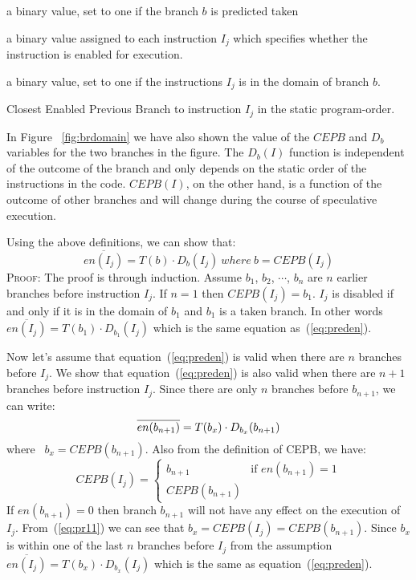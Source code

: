 \documentclass[10pt,twocolumn]{IEEEtran}
\begin{document}
\begin{description}
\item[$T(b)$:] a binary value, set to one if the branch $b$ is
predicted taken
\item[$en(I_j)$:] a binary value assigned to each
instruction $I_j$ which specifies whether the instruction is
enabled for execution.
\item[$D_b(I_j)$:] a binary value,
set to one if the instructions $I_j$ is in the domain of branch $b$.
\item[$CEPB(I_j)$:] Closest Enabled Previous Branch to instruction
$I_j$ in the static program-order.
\end{description}

In Figure ~\ref{fig:brdomain} we have also shown 
the value of the $CEPB$ and $D_b$ variables for the
two branches in the f{ig}ure.
The $D_b(I)$ function is
independent of the outcome of the branch and only depends on the
static order of the instructions in the code.  $CEPB(I)$, on the other
hand, is a function of the outcome of other branches and will
change during the course of speculative execution.

Using the above definitions, we can show that:
%
\begin{equation}
\overline{en(I_j)} = T(b) \cdot D_b(I_j)  \textstyle{\ where\ } b = CEPB(I_j)
\label{eq:preden}
\end{equation}
%
\textsc{Proof:} The proof is through induction.  Assume
$b_1$, $b_2$, $\cdots$, $b_n$ are $n$ earlier branches before
instruction $I_j$.
If $n = 1$ then $CEPB(I_j) = b_1$.  $I_j$ is disabled if and only if it is
in the domain of $b_1$ and $b_1$ is a taken branch.  In other words
$\overline{en(I_j)} = T(b_1) \cdot D_{b_1}(I_j)$ which is the 
same equation as~(\ref{eq:preden}).

Now let's assume that equation~(\ref{eq:preden}) is valid when there are
$n$ branches before $I_j$.  We show that
equation~(\ref{eq:preden}) is also valid when there are $n+1$ branches before
instruction $I_j$.
Since there are only $n$ branches before $b_{n+1}$, we can write:
%
\begin{equation}
\overline{en(b_{n+1})} = T(b_x) \cdot D_{b_x}(b_{n+1}) \\
\label{eq:pr12}
\end{equation}
%
where \ $b_x = CEPB(b_{n+1})$.
Also from the definition of CEPB, we have:
%
\begin{equation}
CEPB(I_j) = \left\{ \begin{array}{ll}
    b_{n+1} & \mbox{if $en(b_{n+1}) = 1$} \\
    CEPB(b_{n+1}) & \mbox{}
    \end{array}
    \right.
\label{eq:pr11}
\end{equation}
%
If $en(b_{n+1}) = 0$ then branch $b_{n+1}$ will not have 
any effect on the execution of $I_j$.  
From~(\ref{eq:pr11}) we
can see that \mbox{$b_x = CEPB(I_j) = CEPB(b_{n+1})$}.  
Since $b_x$ is 
within one of the last $n$ branches before $I_j$ from
the assumption 
\mbox{$\overline{en(I_j)} = T(b_x) \cdot D_{b_x}(I_j)$} which is 
the same as equation~(\ref{eq:preden}).
\end{document}
